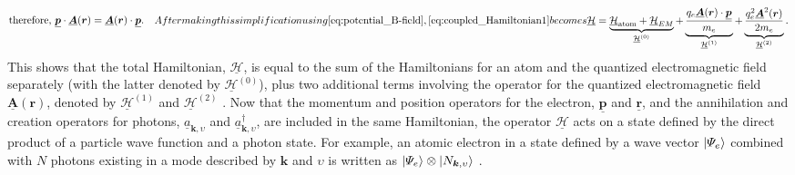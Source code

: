 \begin{subequations}
\begin{align}
\begin{split}
 &\text{therefore, } \underline{\mathbold{p}} \cdot \underline{\mathbold{A}}(\mathbold{r}) = \underline{\mathbold{A}}(\mathbold{r}) \cdot \underline{\mathbold{p}} .
 \end{split} 
 \end{align}
After making this simplification using \cref{eq:potential_B-field}, \cref{eq:coupled_Hamiltonian1} becomes 
\begin{equation}\label{eq:coupled_Hamiltonian3}
 \underline{\mathcal{H}} = \underbrace{\underline{\mathcal{H}}_{\text{atom}} + \underline{\mathcal{H}}_{EM}}_{\underline{\mathcal{H}}^{(0)}} + \underbrace{\frac{q_e \underline{\mathbold{A}} ( \mathbold{r} ) \cdot \underline{\mathbold{p}}}{m_e}}_{\underline{\mathcal{H}}^{(1)}} + \underbrace{\frac{q_e^2 \underline{\mathbold{A}}^2 ( \mathbold{r} )}{2 m_e}}_{\underline{\mathcal{H}}^{(2)}} .
 \end{equation}
\end{subequations}
This shows that the total Hamiltonian, $\underline{\mathcal{H}}$, is equal to the sum of the Hamiltonians for an atom and the quantized electromagnetic field separately (with the latter denoted by $\underline{\mathcal{H}}^{(0)}$), plus two additional terms involving the operator for the quantized electromagnetic field $\underline{\mathbold{A}} ( \mathbold{r} )$, denoted by $\underline{\mathcal{H}}^{(1)}$ and $\underline{\mathcal{H}}^{(2)}$ \cite{Shankar04,Townsend00,Fontana_82}. 
Now that the momentum and position operators for the electron, $\underline{\mathbold{p}}$ and $\underline{\mathbold{r}}$, and the annihilation and creation operators for photons, $\underline{a}_{\mathbold{k},\upsilon}$ and $\underline{a}^{\dagger}_{\mathbold{k},\upsilon}$, are included in the same Hamiltonian, the operator $\underline{\mathcal{H}}$ acts on a state defined by the direct product of a particle wave function and a photon state. 
For example, an atomic electron in a state defined by a wave vector $\ket{\Psi_e}$ combined with $N$ photons existing in a mode described by $\mathbold{k}$ and $\upsilon$ is written as $\ket{\Psi_e} \otimes \ket{N_{\mathbold{k},\upsilon}}$ \cite{Townsend00}. 

